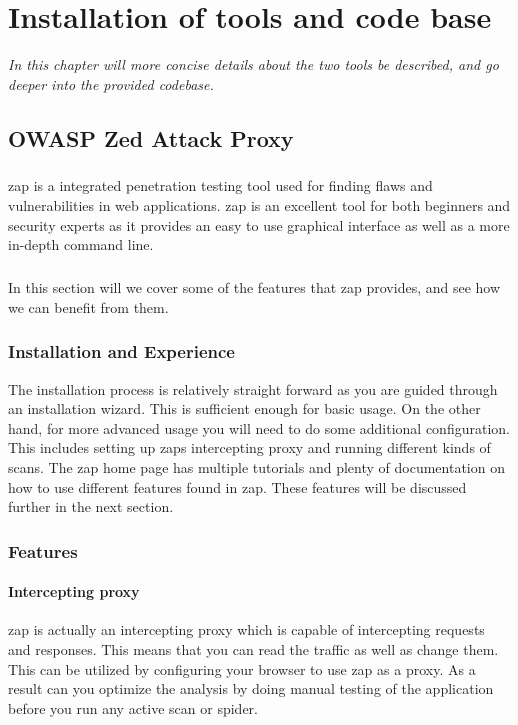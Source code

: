 \documentclass[11pt,english,a4paper]{report}
\begin{document}
\chapter{Installation of tools and code base}
\textit{In this chapter will more concise details about the two tools be described, and go deeper into the provided codebase.}

\section{OWASP Zed Attack Proxy}
\paragraph{}
\gls{zap} is a integrated penetration testing tool used for finding flaws and vulnerabilities in web applications. 
\gls{zap} is an excellent tool for both beginners and security experts as it provides an easy to use graphical interface as well as a more in-depth command line. \cite{zap-documentation}
\paragraph{}
In this section will we cover some of the features that \gls{zap} provides, and see how we can benefit from them.

\subsection{Installation and Experience}
The installation process is relatively straight forward as you are guided through an installation wizard. 
This is sufficient enough for basic usage. 
On the other hand, for more advanced usage you will need to do some additional configuration. 
This includes setting up \glspl{zap} intercepting proxy and running different kinds of scans. 
The \gls{zap} home page has multiple tutorials and plenty of documentation on how to use different features found in \gls{zap}. 
These features will be discussed further in the next section.

\subsection{Features}
\subsubsection{Intercepting proxy}
\gls{zap} is actually an intercepting proxy which is capable of intercepting requests and responses.
This means that you can read the traffic as well as change them.
This can be utilized by configuring your browser to use \gls{zap} as a proxy.
As a result can you optimize the analysis by doing manual testing of the application before you run any active scan or spider.
\end{document}
